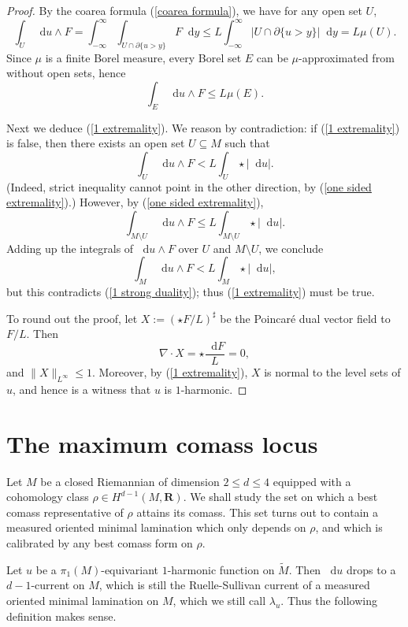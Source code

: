 \documentclass[reqno,11pt]{amsart}
\newcommand{\RR}{\mathbf{R}}
\newcommand*\dif{\mathop{}\!\mathrm{d}}
\theoremstyle{definition}
\numberwithin{equation}{section}
\begin{document}
\begin{proof}
By the coarea formula (\ref{coarea formula}), we have for any open set $U$,
$$\int_U \dif u \wedge F = \int_{-\infty}^\infty \int_{U \cap \partial \{u > y\}} F \dif y \leq L \int_{-\infty}^\infty |U \cap \partial \{u > y\}| \dif y = L \mu(U).$$
Since $\mu$ is a finite Borel measure, every Borel set $E$ can be $\mu$-approximated from without open sets, hence
\begin{equation}\label{one sided extremality}
\int_E \dif u \wedge F \leq L \mu(E).
\end{equation}

Next we deduce (\ref{1 extremality}).
We reason by contradiction: if (\ref{1 extremality}) is false, then there exists an open set $U \subseteq M$ such that 
$$\int_U \dif u \wedge F < L \int_U \star |\dif u|.$$
(Indeed, strict inequality cannot point in the other direction, by (\ref{one sided extremality}).)
However, by (\ref{one sided extremality}), 
$$\int_{M \setminus U} \dif u \wedge F \leq L \int_{M \setminus U} \star |\dif u|.$$
Adding up the integrals of $\dif u \wedge F$ over $U$ and $M \setminus U$, we conclude 
$$\int_M \dif u \wedge F < L \int_M \star |\dif u|,$$
but this contradicts (\ref{1 strong duality}); thus (\ref{1 extremality}) must be true.

To round out the proof, let $X := (\star F/L)^\sharp$ be the Poincar\'e dual vector field to $F/L$. Then
$$\nabla \cdot X = \star \frac{\dif F}{L} = 0,$$
and $\|X\|_{L^\infty} \leq 1$.
Moreover, by (\ref{1 extremality}), $X$ is normal to the level sets of $u$, and hence is a witness that $u$ is $1$-harmonic.
\end{proof}



\section{The maximum comass locus}\label{MCL sec}
Let $M$ be a closed Riemannian of dimension $2 \leq d \leq 4$ equipped with a cohomology class $\rho \in H^{d - 1}(M, \RR)$.
We shall study the set on which a best comass representative of $\rho$ attains its comass.
This set turns out to contain a measured oriented minimal lamination which only depends on $\rho$, and which is calibrated by any best comass form on $\rho$.

Let $u$ be a $\pi_1(M)$-equivariant $1$-harmonic function on $\tilde M$.
Then $\dif u$ drops to a $d-1$-current on $M$, which is still the Ruelle-Sullivan current of a measured oriented minimal lamination on $M$, which we still call $\lambda_u$.
Thus the following definition makes sense.
\end{document}
